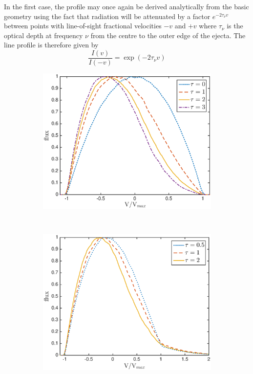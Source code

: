 In the first case, the profile may once again be derived analytically from 
the basic geometry using the fact that radiation will be attenuated by a 
factor $e^{-2\tau_{\nu} v}$ between points with line-of-sight fractional 
velocities $-v$ and $+v$ where $\tau_{\nu}$ is the optical depth at 
frequency $\nu$ from the centre to the outer edge of the ejecta.  The line 
profile is therefore given by
\begin{equation}
\frac{I(v)}{I(-v)} = \exp(-2\tau_{\nu} v)  
\end{equation}
\begin{figure}
\begin{subfigure}{\textwidth}
\centering
\includegraphics[trim =10 0 45 15,clip=true,scale=0.67]{chapters/chapter4/images/params/opt_thick_w0}
\end{subfigure} \\[1ex]
\begin{subfigure}{\textwidth} 
\centering
\includegraphics[trim =10 0 45 15,clip=true,scale=0.67]{chapters/chapter4/images/params/opt_thick_w0_6}

\end{subfigure}
\end{figure}
